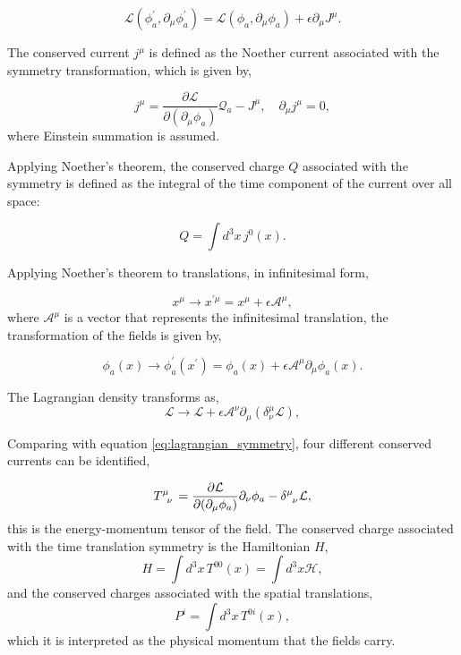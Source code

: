 \documentclass[11pt,a4paper,twoside,pdf]{article}
\numberwithin{equation}{section}
\begin{document}
\begin{equation}
    \mathcal{L}(\phi_a^\prime, \partial_\mu \phi_a^\prime) = 
    \mathcal{L}(\phi_a, \partial_\mu \phi_a) + \epsilon \partial_\mu J^\mu.
    \label{eq:lagrangian_symmetry}
\end{equation}

The conserved current \(j^\mu\) is defined as the Noether current associated with the
symmetry transformation, which is given by,

\begin{equation}
    j^\mu = \frac{\partial \mathcal{L}}{\partial (\partial_\mu \phi_a)} \mathcal{Q}_a 
    - J^\mu, \quad \partial_\mu j^\mu = 0,
\end{equation}
where Einstein summation is assumed.

Applying Noether's theorem, the conserved charge \(Q\) associated with the symmetry is 
defined as the integral of the time component of the current over all space:

\begin{equation}
    Q = \int d^3x \, j^0(x).
\end{equation}

Applying Noether's theorem to translations, in infinitesimal form, 

\begin{equation}
    x^\mu \to x^{\prime\mu} = x^\mu + \epsilon \mathcal{A}^\mu,
\end{equation}
where \(\mathcal{A}^\mu\) is a vector that represents the infinitesimal translation, 
the transformation of the fields is given by,

\begin{equation}
    \phi_a(x) \to \phi_a^\prime(x^\prime) = \phi_a(x) + \epsilon \mathcal{A}^\mu 
    \partial_\mu \phi_a(x).
\end{equation}

The Lagrangian density transforms as,
\begin{equation}
    \mathcal{L} \to \mathcal{L} + \epsilon \mathcal{A}^\nu \partial_\mu 
    \left(\delta_\nu^\mu \mathcal{L}\right),
\end{equation}

Comparing with equation \eqref{eq:lagrangian_symmetry}, four different conserved
currents can be identified,

\begin{equation}
    \tensor{T}{^\mu_\nu} = \frac{\partial \mathcal{L}}{\partial (\partial_\mu \phi_a)} 
    \partial_\nu \phi_a - \tensor{\delta}{^\mu_\nu} \mathcal{L},
\end{equation}
this is the energy-momentum tensor of the field. The conserved charge associated with
the time translation symmetry is the Hamiltonian \(H\), 
\begin{equation}
    H = \int d^3x \, T^{00}(x) = \int d^3x \mathcal{H},
    \label{eq:energy_momentum_hamiltonian}
\end{equation}  
and the conserved charges associated with the spatial translations,
\begin{equation}
    P^i = \int d^3x \, T^{0i}(x),
\end{equation}
which it is interpreted as the physical momentum that the fields carry.
\end{document}
